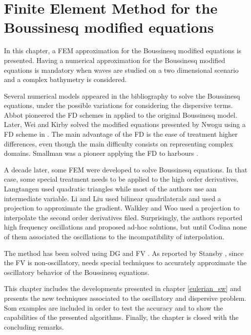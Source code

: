 
\chapter{Finite Element Method for the Boussinesq modified equations}
\label{eulerian_bsq}


In this chapter, a FEM approximation for the Boussinesq modified equations is presented. Having a numerical approximation for the Boussinesq modified equations is mandatory when waves are studied on a two dimensional scenario and a complex bathymetry is considered.

Several numerical models appeared in the bibliography to solve the Boussinesq equations, under the possible variations for considering the dispersive terms. Abbot pioneered the FD schemes in \cite{abbott1978,abbott1979} applied to the original Boussinesq model. Later, Wei and Kirby solved the modified equations presented by Nwogu \cite{nwogu1993} using a FD scheme in \cite{wei1995}. The main advantage of the FD is the ease of treatment higher differences, even though the main difficulty consists on representing complex domains. Smallman was a pioneer applying the FD to harbours \cite{smallman1989}.

A decade later, some FEM were developed to solve Boussinesq equations. In that case, some special treatment needs to be applied to the high order derivatives. Langtangen \cite{langtangen1998} used quadratic triangles while most of the authors use aan intermediate variable. Li and Liu \cite{li1999} used bilinear quadrilaterals and used a projection to approximate the gradient. Walkley \cite{walkley2002} and Woo \cite{woo2004a,woo2004b} used a projection to interpolate the second order derivatives filed. Surprisingly, the authors reported high frequency oscillations and proposed ad-hoc solutions, but until Codina \cite{codina2008,codina2008b} none of them associated the oscillations to the incompatibility of interpolation.

The method has been solved using DG \cite{eskilsson2002} and FV \cite{bradford2002,stansby2003}. As reported by Stansby \cite{stansby2003}, since the FV is non-oscillatory, needs special techniques to accurately approximate the oscillatory behavior of the Boussinesq equations.

This chapter includes the developments presented in chapter \ref{eulerian_sw} and presents the new techniques associated to the oscillatory and dispersive problem. 
Som examples are included in order to test the accuracy and to show the capabilities of the presented algorithms.
Finally, the chapter is closed with the concluding remarks.



